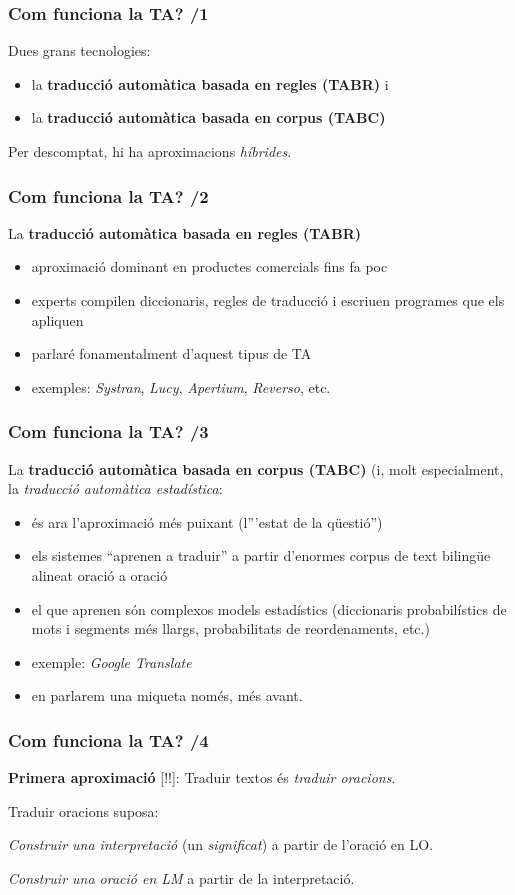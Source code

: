 \documentclass{beamer}
\newcommand{\empha}[1]{\emph{#1}\/}
\begin{document}
\begin{frame}
  \frametitle{Com funciona la TA? /1}
Dues grans tecnologies: 
\begin{itemize}
\item la \textbf{traducció automàtica basada en regles (TABR)} i
\item la \textbf{traducció automàtica basada en corpus (TABC)} 
\end{itemize}
Per descomptat, hi ha aproximacions \empha{híbrides}.
\end{frame}

\begin{frame}
  \frametitle{Com funciona la TA? /2}

La \textbf{traducció automàtica basada en regles (TABR)}
  \begin{itemize}
  \item aproximació dominant en productes comercials fins fa poc
  \item experts compilen diccionaris, regles de traducció i escriuen programes que els apliquen
  \item parlaré fonamentalment d'aquest tipus de TA
  \item exemples: \empha{Systran}, \empha{Lucy}, \empha{Apertium}, \empha{Reverso}, etc.
  \end{itemize}
\end{frame}


\begin{frame}
  \frametitle{Com funciona la TA? /3}
La \textbf{traducció automàtica basada en corpus (TABC)} (i, molt especialment, la \empha{traducció automàtica estadística}:
  \begin{itemize}
  \item és ara l'aproximació més puixant (l'''estat de la qüestió'')
  \item els sistemes ``aprenen a traduir'' a partir d'enormes corpus de text bilingüe alineat oració a oració
  \item el que aprenen són complexos models estadístics (diccionaris probabilístics de mots i segments més llargs, probabilitats de reordenaments, etc.)
  \item exemple: \empha{Google Translate}
  \item en parlarem una miqueta només, més avant.
  \end{itemize}
\end{frame}

\begin{frame}
\frametitle{ Com funciona la TA? /4}

\textbf{Primera aproximació} [!!]: Traduir textos és
\empha{traduir oracions}.

Traduir oracions suposa:

{
\begin{itemize}
  {\item \empha{Construir una interpretació} (un
    \empha{significat}) a partir de l'oració en LO.}  {\item
  \empha{Construir una oració en LM} a partir de la interpretació.}
\end{itemize}
}
\end{frame}
\end{document}
